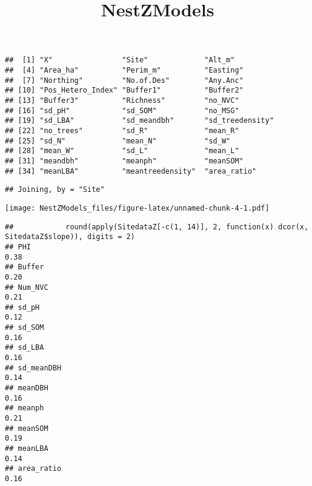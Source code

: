 \documentclass[]{article}
\title{NestZModels}
\author{}
\date{}
\begin{document}
\maketitle

\begin{verbatim}
##  [1] "X"                "Site"             "Alt_m"           
##  [4] "Area_ha"          "Perim_m"          "Easting"         
##  [7] "Northing"         "No.of.Des"        "Any.Anc"         
## [10] "Pos_Hetero_Index" "Buffer1"          "Buffer2"         
## [13] "Buffer3"          "Richness"         "no_NVC"          
## [16] "sd_pH"            "sd_SOM"           "no_MSG"          
## [19] "sd_LBA"           "sd_meandbh"       "sd_treedensity"  
## [22] "no_trees"         "sd_R"             "mean_R"          
## [25] "sd_N"             "mean_N"           "sd_W"            
## [28] "mean_W"           "sd_L"             "mean_L"          
## [31] "meandbh"          "meanph"           "meanSOM"         
## [34] "meanLBA"          "meantreedensity"  "area_ratio"
\end{verbatim}

\begin{verbatim}
## Joining, by = "Site"
\end{verbatim}

\texttt{[image: NestZModels\_files/figure-latex/unnamed-chunk-4-1.pdf]}

\begin{verbatim}
##            round(apply(SitedataZ[-c(1, 14)], 2, function(x) dcor(x, SitedataZ$slope)), digits = 2)
## PHI                                                                                           0.38
## Buffer                                                                                        0.20
## Num_NVC                                                                                       0.21
## sd_pH                                                                                         0.12
## sd_SOM                                                                                        0.16
## sd_LBA                                                                                        0.16
## sd_meanDBH                                                                                    0.14
## meanDBH                                                                                       0.16
## meanph                                                                                        0.21
## meanSOM                                                                                       0.19
## meanLBA                                                                                       0.14
## area_ratio                                                                                    0.16
\end{verbatim}
\end{document}
